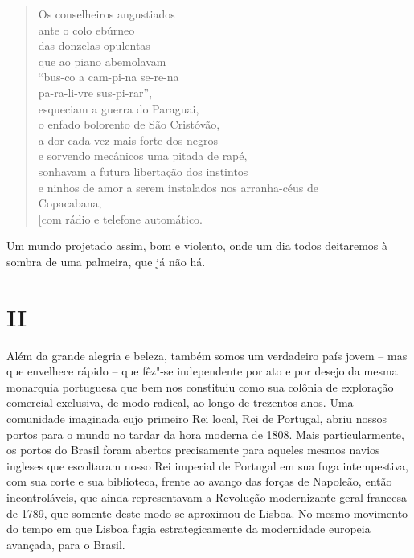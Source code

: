 \begin{verse}
Os conselheiros angustiados\\
ante o colo ebúrneo\\
das donzelas opulentas\\
que ao piano abemolavam\\
``bus-co a cam-pi-na se-re-na\\
pa-ra-li-vre sus-pi-rar'',\\
esqueciam a guerra do Paraguai,\\
o enfado bolorento de São Cristóvão,\\
\hspace{15pt}a dor cada vez mais forte dos negros\\
e sorvendo mecânicos uma pitada de rapé,\\
sonhavam a futura libertação dos instintos\\
e ninhos de amor a serem instalados nos \qb{}arranha-céus de\\
Copacabana,\\
{[}com rádio e telefone automático.
\end{verse}

Um mundo projetado assim, bom e violento, onde um dia todos deitaremos à
sombra de uma palmeira, que já não há.

\section{II}

Além da grande alegria e beleza, também somos um verdadeiro país jovem
-- mas que envelhece rápido -- que fêz"-se independente por ato e por
desejo da mesma monarquia portuguesa que bem nos constituiu como sua
colônia de exploração comercial exclusiva, de modo radical, ao longo de
trezentos anos. Uma comunidade imaginada cujo primeiro Rei local, Rei de
Portugal, abriu nossos portos para o mundo no tardar da hora moderna de
1808. Mais particularmente, os portos do Brasil foram abertos
precisamente para aqueles mesmos navios ingleses que escoltaram nosso
Rei imperial de Portugal em sua fuga intempestiva, com sua corte e sua
biblioteca, frente ao avanço das forças de Napoleão, então
incontroláveis, que ainda representavam a Revolução modernizante geral
francesa de 1789, que somente deste modo se aproximou de Lisboa. No
mesmo movimento do tempo em que Lisboa fugia estrategicamente da
modernidade europeia avançada, para o Brasil.

